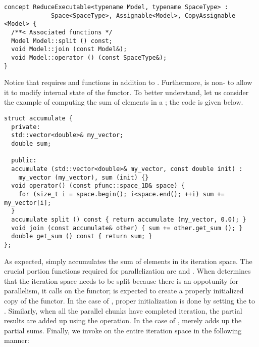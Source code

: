 \begin{center}
\begin{minipage}{0.8\textwidth}
\begin{lstlisting}
concept ReduceExecutable<typename Model, typename SpaceType> : 
             Space<SpaceType>, Assignable<Model>, CopyAssignable <Model> {
  /**< Associated functions */
  Model Model::split () const;
  void Model::join (const Model&);
  void Model::operator () (const SpaceType&);
}
\end{lstlisting}
\end{minipage}
\end{center}
%
Notice that  requires  and  
functions in addition to .
%
Furthermore,  is non- to allow it to modify 
internal state of the functor.
%
To better understand, let us consider the example of computing the sum of 
elements in a ; the code is given below.
%
\begin{center}
\begin{minipage}{0.7\textwidth}
\begin{lstlisting}
struct accumulate {
  private:
  std::vector<double>& my_vector;
  double sum;

  public:
  accumulate (std::vector<double>& my_vector, const double init) :
    my_vector (my_vector), sum (init) {}
  void operator() (const pfunc::space_1D& space) {
    for (size_t i = space.begin(); i<space.end(); ++i) sum += my_vector[i];
  }
  accumulate split () const { return accumulate (my_vector, 0.0); }
  void join (const accumulate& other) { sum += other.get_sum (); }
  double get_sum () const { return sum; }
};
\end{lstlisting}
\end{minipage}
\end{center}
%
As expected,  simply accumulates the sum of elements in its 
iteration space.
%
The crucial portion functions required for parallelization are  
and .
%
When  determines that the iteration space needs 
to be split because there is an oppotunity for parallelism, it calls
 on the functor;  is expected to create a properly 
initialized copy of the functor.
%
In the case of , proper initialization is done by setting the 
 to .
%
Similarly, when all the parallel chunks have completed iteration, the partial 
results are added up using the  operation.
%
In the case of ,  merely adds up the partial 
sums. 
%
Finally, we invoke  on the entire iteration space
in the following manner:

